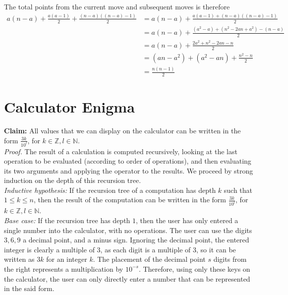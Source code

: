\documentclass{article}
\begin{document}
The total points from the current move and subsequent moves is therefore
\begin{align}
    a(n-a)+\frac{a(a-1)}{2}+\frac{(n-a)((n-a)-1)}{2} &= a(n-a)+\frac{a(a-1)+(n-a)((n-a)-1)}{2} \\
    &= a(n-a)+\frac{(a^2-a)+(n^2-2an+a^2) - (n-a)}{2} \\
    &= a(n-a)+\frac{2a^2+n^2-2an -n}{2} \\
    &= (an-a^2) + (a^2-an) + \frac{n^2-n}{2} \\
    &= \frac{n(n-1)}{2}
\end{align}

\section{Calculator Enigma}
    \textbf{Claim:} All values that we can display on the calculator can be written in the form $\frac{3k}{10^l}$, for $k \in \mathbb{Z}, l \in \mathbb{N}$. \\
    
    \textit{Proof.} The result of a calculation is computed recursively, looking at the last operation to be evaluated (according to order of operations), and then evaluating its two arguments and applying the operator to the results. We proceed by strong induction on the depth of this recursion tree. \\
    
    \textit{Inductive hypothesis:} If the recursion tree of a computation has depth $k$ such that $1 \leq k \le n$, then the result of the computation can be written in the form $\frac{3k}{10^l}$, for $k \in \mathbb{Z}, l \in \mathbb{N}$. \\
    
    \textit{Base case:} If the recursion tree has depth $1$, then the user has only entered a single number into the calculator, with no operations. The user can use the digits $3, 6, 9$ a decimal point, and a minus sign. Ignoring the decimal point, the entered integer is clearly a multiple of $3$, as each digit is a multiple of $3$, so it can be written as $3k$ for an integer $k$. The placement of the decimal point $s$ digits from the right represents a multiplication by $10^{-s}$. Therefore, using only these keys on the calculator, the user can only directly enter a number that can be represented in the said form. \\
    
\end{document}
